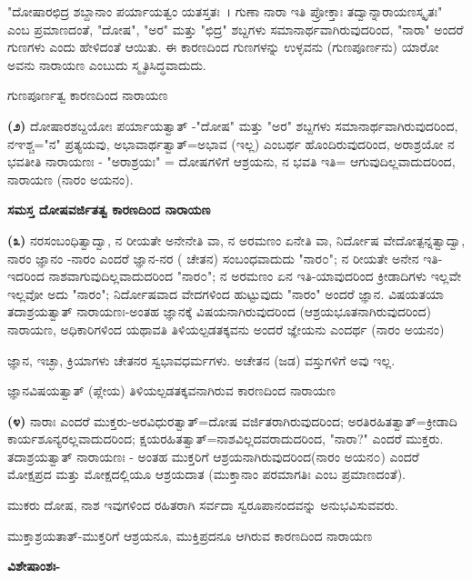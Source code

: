 "ದೋಷಾರಛಿದ್ರ ಶಬ್ದಾನಾಂ ಪರ್ಯಾಯತ್ವಂ ಯತಸ್ತತಃ~। ಗುಣಾ ನಾರಾ ಇತಿ ಪ್ರೋಕ್ತಾಃ ತದ್ವಾನ್ನಾರಾಯಣಸ್ಕೃತಃ" ಎಂಬ ಪ್ರಮಾಣದಂತೆ, "ದೋಷ", "ಅರ" ಮತ್ತು "ಛಿದ್ರ" ಶಬ್ದಗಳು ಸಮಾನಾರ್ಥವಾಗಿರುವುದರಿಂದ, "ನಾರಾ" ಅಂದರೆ ಗುಣಗಳು ಎಂದು ಹೇಳಿದಂತೆ ಆಯಿತು. ಈ ಕಾರಣದಿಂದ ಗುಣಗಳನ್ನು ಉಳ್ಳವನು (ಗುಣಪೂರ್ಣನು) ಯಾರೋ ಅವನು ನಾರಾಯಣ ಎಂಬುದು ಸ್ಮೃತಿಸಿದ್ಧವಾದುದು.

\begin{center}
ಗುಣಪೂರ್ಣತ್ವ ಕಾರಣದಿಂದ ನಾರಾಯಣ
\end{center}

\textbf{(೨)} ದೋಷಾರಶಬ್ದಯೋಃ ಪರ್ಯಾಯತ್ವಾತ್ -"ದೋಷ" ಮತ್ತು "ಅರ" ಶಬ್ದಗಳು ಸಮಾನಾರ್ಥವಾಗಿರುವುದರಿಂದ, ನಞಶ್ಚ="ನ" ಪ್ರತ್ಯಯವು, ಅಭಾವಾರ್ಥತ್ವಾತ್=ಅಭಾವ (ಇಲ್ಲ) ಎಂಬರ್ಥ ಹೊಂದಿರುವುದರಿಂದ, ಅರಾಶ್ರಯೋ ನ ಭವತೀತಿ ನಾರಾಯಣಃ - "ಅರಾಶ್ರಯಃ" = ದೋಷಗಳಿಗೆ ಆಶ್ರಯನು, ನ ಭವತಿ ಇತಿ= ಆಗುವುದಿಲ್ಲವಾದುದರಿಂದ, ನಾರಾಯಣ (ನಾರಂ ಅಯನಂ).

\begin{center}
\textbf{ಸಮಸ್ತ ದೋಷವರ್ಜಿತತ್ವ ಕಾರಣದಿಂದ ನಾರಾಯಣ}
\end{center}

\textbf{(೩)} ನರಸಂಬಂಧಿತ್ವಾದ್ವಾ, ನ ರೀಯತೇ ಅನೇನೇತಿ ವಾ, ನ ಅರಮಣಂ ಏನೇತಿ ವಾ, ನಿರ್ದೋಷ ವೇದೋತ್ಪನ್ನತ್ವಾದ್ವಾ, ನಾರಂ ಜ್ಞಾನಂ -ನಾರಂ ಎಂದರೆ ಜ್ಞಾನ-ನರ ( ಚೇತನ) ಸಂಬಂಧವಾದುದು "ನಾರ೦"; ನ ರೀಯತೇ ಅನೇನ ಇತಿ-ಇದರಿಂದ ನಾಶವಾಗುವುದಿಲ್ಲವಾದುದರಿಂದ "ನಾರ೦"; ನ ಅರಮಣಂ ಏನ ಇತಿ-ಯಾವುದರಿಂದ ಕ್ರೀಡಾದಿಗಳು ಇಲ್ಲವೇ ಇಲ್ಲವೋ ಅದು "ನಾರಂ"; ನಿರ್ದೋಷವಾದ ವೇದಗಳಿಂದ ಹುಟ್ಟುವುದು "ನಾರಂ" ಅಂದರೆ ಜ್ಞಾನ. ವಿಷಯತಯಾ ತದಾಶ್ರಯತ್ವಾತ್ ನಾರಾಯಣಃ-ಅಂತಹ ಜ್ಞಾನಕ್ಕೆ ವಿಷಯನಾಗಿರುವುದರಿಂದ (ಆಶ್ರಯಭೂತನಾಗಿರುವುದರಿಂದ) ನಾರಾಯಣ, ಅಧಿಕಾರಿಗಳಿಂದ ಯಥಾವತಿ ತಿಳಿಯಲ್ಪಡತಕ್ಕವನು ಅಂದರೆ ಜ್ಞೇಯನು ಎಂದರ್ಥ (ನಾರಂ ಅಯನಂ)

ಜ್ಞಾನ, ಇಚ್ಛಾ, ಕ್ರಿಯಾಗಳು ಚೇತನರ ಸ್ವಭಾವಧರ್ಮಗಳು. ಅಚೇತನ (ಜಡ) ವಸ್ತುಗಳಿಗೆ ಅವು ಇಲ್ಲ.

\begin{center}
ಜ್ಞಾನವಿಷಯತ್ವಾತ್ (ಪ್ಲೇಯ) ತಿಳಿಯಲ್ಪಡತಕ್ಕವನಾಗಿರುವ ಕಾರಣದಿಂದ ನಾರಾಯಣ
\end{center}

\textbf{(೪)} ನಾರಾಃ ಎಂದರೆ ಮುಕ್ತರು-ಅರವಿಧುರತ್ವಾತ್=ದೋಷ ವರ್ಜಿತರಾಗಿರುವುದರಿಂದ; ಅರತಿರಹಿತತ್ವಾತ್=ಕ್ರೀಡಾದಿ ಕಾರ್ಯಶೂನ್ಯರಲ್ಲವಾದುದರಿಂದ; ಕ್ಷಯರಹಿತತ್ವಾತ್=ನಾಶವಿಲ್ಲದವರಾದುದರಿಂದ, "ನಾರಾ?" ಎಂದರೆ ಮುಕ್ತರು. ತದಾಶ್ರಯತ್ವಾತ್ ನಾರಾಯಣಃ - ಅಂತಹ ಮುಕ್ತರಿಗೆ ಆಶ್ರಯನಾಗಿರುವುದರಿಂದ(ನಾರಂ ಅಯನ೦) ಎಂದರೆ ಮೋಕ್ಷಪ್ರದ ಮತ್ತು ಮೋಕ್ಷದಲ್ಲಿಯೂ ಆಶ್ರಯದಾತ (ಮುಕ್ತಾನಾಂ ಪರಮಾಗತಿಃ ಎಂಬ ಪ್ರಮಾಣದಂತೆ).

ಮುಕರು ದೋಷ, ನಾಶ ಇವುಗಳಿಂದ ರಹಿತರಾಗಿ ಸರ್ವದಾ ಸ್ವರೂಪಾನಂದವನ್ನು ಅನುಭವಿಸುವವರು.

\begin{center}
ಮುಕ್ತಾಶ್ರಯತಾತ್-ಮುಕ್ತರಿಗೆ ಆಶ್ರಯನೂ, ಮುಕ್ತಿಪ್ರದನೂ ಆಗಿರುವ ಕಾರಣದಿಂದ ನಾರಾಯಣ
\end{center}

\noindent
\textbf{ವಿಶೇಷಾಂಶಃ-}

